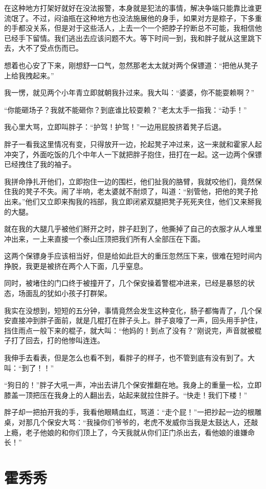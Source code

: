 在这种地方打架好就好在没法报警，本身就是犯法的事情，解决争端只能靠比谁更流氓了。不过，闷油瓶在这种地方也没法施展他的身手，如果对方是粽子，下多重的手都没关系，但是对于这些活人，上去一个一个把脖子拧断总不可能，我相信他已经手下留情。我们逃出去应该问题不大。等下时间一到，我和胖子就从这里跳下去，大不了受点伤而已。

想着也心安了下来，刚想舒一口气，忽然那老太太就对两个保镖道：“把他从凳子上给我拽起来。”

我一愣，就见两个小年青立即就朝我扑过来。我大叫：“婆婆，你不能耍赖啊？”

“你能砸场子？我就不能砸你？到底谁比较耍赖？”老太太手一指我：“动手！”

我心里大骂，立即叫胖子：“护驾！护驾！”一边用屁股挤着凳子后退。

胖子一看我这里情况有变，只得放开一边，抡起凳子冲过来，这一来就和霍家人起冲突了，外面吃饭的几个中年人一下就把胖子抱住，扭打在一起。这一边两个保镖已经拽住了我的袖子。

我拼命挣扎开他们，立即抱住一边的围栏，他们扯我的胳臂，我就咬他们，竟然保住我的凳子不失。闹了半响，老太婆就不耐烦了，叫道：“别管他，把他的凳子抢出来。”他们又立即来掏我的裆部，我立即闭紧双腿把凳子死死夹住，他们又来掰我的大腿。

就在我的大腿几乎被他们掰开之时，胖子赶到了，他撕掉了自己的衣服才从人堆里冲出来，一上来直接一个泰山压顶把我们所有人全部压在下面。

这两个保镖身手应该相当好，但是给如此巨大的重压忽然压下来，很难在短时间内挣脱，我更是被挤在两个人下面，几乎窒息。

同时，被堵住的门口终于被撞开了，几个保安操着警棍冲进来，已经是暴怒的状态，场面乱的犹如小孩子打群架。

我实在没想到，短短的五分钟，事情竟然会发生这种变化，肠子都悔青了，几个保安直接冲到胖子面前，就是几棍打在胖子头上。胖子哀嚎了一声，回头用手护住，挡住雨点一般下来的棍子，就大叫：“他妈的！到点了没有？”刚说完，声音就被棍子打了回去，打的他惨叫连连。

我伸手去看表，但是怎么也看不到，看胖子的样子，也不管到底有没有到了。大叫：“到了！！”

“狗日的！”胖子大吼一声，冲出去讲几个保安推翻在地。我身上的重量一松，立即膝盖一顶把压在我身上的人翻出去，站起来就拉住胖子。“快走！我们下楼！”

胖子却一把拍开我的手，我看他眼睛血红，骂道：“走个屁！”一把抄起一边的根雕桌，对那几个保安大骂：“我操你们爷爷的，老虎不发威你当我是太鼓达人，还敲上瘾，老子他娘的和你们顶上了，今天我就从你们正门杀出去，看他娘的谁嫌命长！”

\chapter{霍秀秀}


